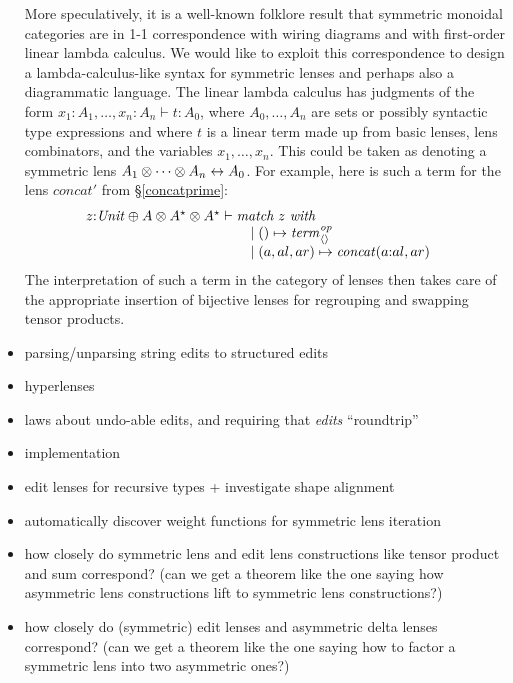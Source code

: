 \begin{itemize}
        More speculatively, it is a well-known folklore result that
        symmetric monoidal categories are in 1-1 correspondence with wiring
        diagrams and with first-order linear lambda calculus. We would like
        to exploit this correspondence to design a lambda-calculus-like
        syntax for symmetric lenses and perhaps also a diagrammatic
        language. The linear lambda calculus has judgments of the form
        $x_1{:}A_1,\dots,x_n{:}A_n\vdash t:A_0$, where $A_0,\dots,A_n$ are
        sets or possibly syntactic type expressions and where $t$ is a
        linear term made up from basic lenses, lens combinators, and the
        variables $x_1,\dots,x_n$. This could be taken as denoting a
        symmetric lens $A_1\otimes\dots\otimes A_n\leftrightarrow A_0$. For example,
        here is such a term for the lens $\mathit{concat}'$ from
        \S\ref{concatprime}:
        \[\begin{array}{@{}l}
        z{:}\Unit \oplus A \otimes A\LIST\otimes A\LIST\vdash
            \begin{array}[t]{@{}l}
            \textit{match}\ z\ \textit{with} \\
            \quad \mid\mlinl\unit \mapsto \const_{\NIL}\op\\
            \quad\mid\mlinr(a,al,ar)\mapsto \mathit{concat}(a\CONS al,ar)
            \end{array}
        \end{array}
        \]
        The interpretation of such a term in the category of lenses then
        takes care of the appropriate insertion of bijective lenses for
        regrouping and swapping tensor products.
    \item parsing/unparsing string edits to structured edits
    \item hyperlenses
    \item laws about undo-able edits, and requiring that \emph{edits} ``roundtrip''
    \item implementation
    \item edit lenses for recursive types + investigate shape alignment
    \item automatically discover weight functions for symmetric lens
        iteration
    \item how closely do symmetric lens and edit lens constructions like
        tensor product and sum correspond? (can we get a theorem like the
        one saying how asymmetric lens constructions lift to symmetric lens
        constructions?)
    \item how closely do (symmetric) edit lenses and asymmetric delta lenses
        correspond? (can we get a theorem like the one saying how to
        factor a symmetric lens into two asymmetric ones?)
\end{itemize}

